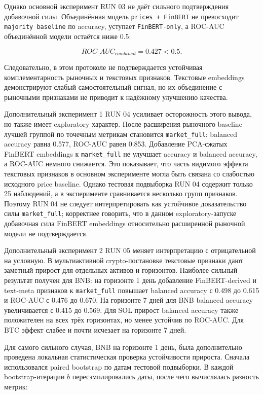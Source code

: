 Однако основной эксперимент RUN 03 не даёт сильного подтверждения добавочной силы. Объединённая модель \texttt{prices + FinBERT} не превосходит \texttt{majority baseline} по accuracy, уступает \texttt{FinBERT-only}, а ROC-AUC объединённой модели остаётся ниже 0.5:

\[
ROC\text{-}AUC_{combined} = 0.427 < 0.5.
\]

Следовательно, в этом протоколе не подтверждается устойчивая комплементарность рыночных и текстовых признаков. Текстовые embeddings демонстрируют слабый самостоятельный сигнал, но их объединение с рыночными признаками не приводит к надёжному улучшению качества.

Дополнительный эксперимент 1 RUN 04 усиливает осторожность этого вывода, но также имеет exploratory характер. После расширения рыночного baseline лучшей группой по точечным метрикам становится \texttt{market\_full}: balanced accuracy равна 0.577, ROC-AUC равен 0.853. Добавление PCA-сжатых FinBERT embeddings к \texttt{market\_full} не улучшает accuracy и balanced accuracy, а ROC-AUC немного снижается. Это показывает, что часть видимого эффекта текстовых признаков в основном эксперименте могла быть связана со слабостью исходного price baseline. Однако тестовая подвыборка RUN 04 содержит только 25 наблюдений, а в эксперименте сравнивается несколько групп признаков. Поэтому RUN 04 не следует интерпретировать как устойчивое доказательство силы \texttt{market\_full}; корректнее говорить, что в данном exploratory-запуске добавочная сила FinBERT embeddings относительно расширенной рыночной модели не подтверждается.

Дополнительный эксперимент 2 RUN 05 меняет интерпретацию с отрицательной на условную. В мультиактивной crypto-постановке текстовые признаки дают заметный прирост для отдельных активов и горизонтов. Наиболее сильный результат получен для BNB: на горизонте 1 день добавление FinBERT-derived и text-meta признаков к \texttt{market\_full} повышает balanced accuracy с 0.498 до 0.615 и ROC-AUC с 0.476 до 0.670. На горизонте 7 дней для BNB balanced accuracy увеличивается с 0.415 до 0.569. Для SOL прирост balanced accuracy также положителен на всех трёх горизонтах, но менее устойчив по ROC-AUC. Для BTC эффект слабее и почти исчезает на горизонте 7 дней.

Для самого сильного случая, BNB на горизонте 1 день, была дополнительно проведена локальная статистическая проверка устойчивости прироста. Сначала использовался paired bootstrap по датам тестовой подвыборки. В каждой bootstrap-итерации $b$ пересэмплировались даты, после чего вычислялась разность метрик:


